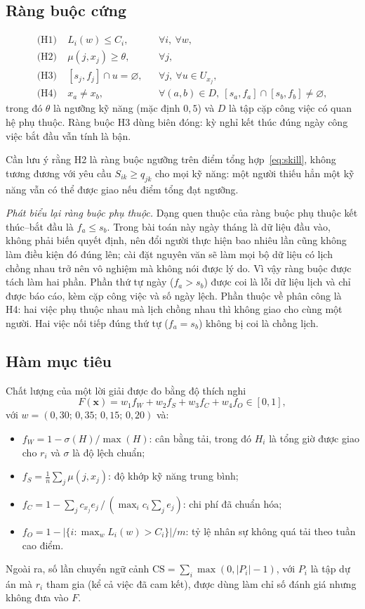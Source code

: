 \documentclass{IEEEtran}
\begin{document}
\subsection{Ràng buộc cứng}

\begin{align}
\text{(H1)}\;& L_i(w)\le C_i, && \forall i,\ \forall w,\\
\text{(H2)}\;& \mu(j,x_j)\ge\theta, && \forall j,\\
\text{(H3)}\;& [s_j,f_j]\cap u=\varnothing, && \forall j,\ \forall u\in U_{x_j},\\
\text{(H4)}\;& x_a\ne x_b, && \forall (a,b)\in D,\ [s_a,f_a]\cap[s_b,f_b]\ne\varnothing,
\end{align}
trong đó $\theta$ là ngưỡng kỹ năng (mặc định $0{,}5$) và $D$ là tập cặp công việc có quan hệ phụ thuộc. Ràng buộc H3 dùng biên đóng: kỳ nghỉ kết thúc đúng ngày công việc bắt đầu vẫn tính là bận.

Cần lưu ý rằng H2 là ràng buộc ngưỡng trên điểm tổng hợp~\eqref{eq:skill}, không tương đương với yêu cầu $S_{ik}\ge q_{jk}$ cho mọi kỹ năng: một người thiếu hẳn một kỹ năng vẫn có thể được giao nếu điểm tổng đạt ngưỡng.

\textit{Phát biểu lại ràng buộc phụ thuộc.} Dạng quen thuộc của ràng buộc phụ thuộc kết thúc--bắt đầu là $f_a\le s_b$. Trong bài toán này ngày tháng là dữ liệu đầu vào, không phải biến quyết định, nên đổi người thực hiện bao nhiêu lần cũng không làm điều kiện đó đúng lên; cài đặt nguyên văn sẽ làm mọi bộ dữ liệu có lịch chồng nhau trở nên vô nghiệm mà không nói được lý do. Vì vậy ràng buộc được tách làm hai phần. Phần thứ tự ngày ($f_a>s_b$) được coi là lỗi dữ liệu lịch và chỉ được báo cáo, kèm cặp công việc và số ngày lệch. Phần thuộc về phân công là H4: hai việc phụ thuộc nhau mà lịch chồng nhau thì không giao cho cùng một người. Hai việc nối tiếp đúng thứ tự ($f_a=s_b$) không bị coi là chồng lịch.

\subsection{Hàm mục tiêu}

Chất lượng của một lời giải được đo bằng độ thích nghi
\begin{equation}
F(\mathbf{x})=w_1 f_W+w_2 f_S+w_3 f_C+w_4 f_O\in[0,1],
\label{eq:fitness}
\end{equation}
với $w=(0{,}30;\,0{,}35;\,0{,}15;\,0{,}20)$ và:
\begin{itemize}
  \item $f_W=1-\sigma(H)/\max(H)$: cân bằng tải, trong đó $H_i$ là tổng giờ được giao cho $r_i$ và $\sigma$ là độ lệch chuẩn;
  \item $f_S=\frac{1}{n}\sum_j \mu(j,x_j)$: độ khớp kỹ năng trung bình;
  \item $f_C=1-\sum_j c_{x_j}e_j\,/\,(\max_i c_i\sum_j e_j)$: chi phí đã chuẩn hóa;
  \item $f_O=1-|\{i:\max_w L_i(w)>C_i\}|/m$: tỷ lệ nhân sự không quá tải theo tuần cao điểm.
\end{itemize}
Ngoài ra, số lần chuyển ngữ cảnh $\mathrm{CS}=\sum_i\max(0,|P_i|-1)$, với $P_i$ là tập dự án mà $r_i$ tham gia (kể cả việc đã cam kết), được dùng làm chỉ số đánh giá nhưng không đưa vào $F$.
\end{document}
